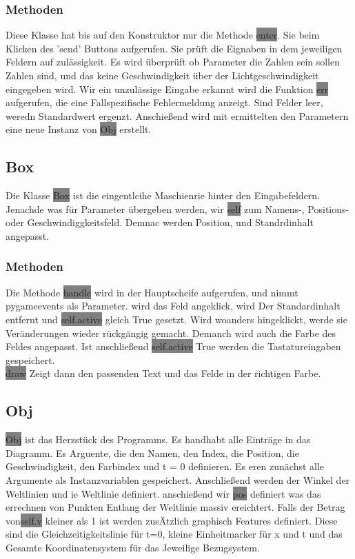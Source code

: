 \documentclass[12pt]{article}
\begin{document}
\subsubsection{Methoden}
Diese Klasse hat bis auf den Konstruktor nur die Methode \colorbox{gray}{enter}.
Sie beim Klicken des 'send' Buttons aufgerufen.
Sie prüft die Eignaben in dem jeweiligen Feldern auf zulässigkeit.
Es wird überprüft ob Parameter die Zahlen sein sollen Zahlen sind, und das keine Geschwindigkeit über der Lichtgeschwindigkeit eingegeben wird.
Wir ein unzulässige Eingabe erkannt wird die Funktion \colorbox{gray}{err} aufgerufen, die eine Fallspezifische Fehlermeldung anzeigt.
Sind Felder leer, weredn Standardwert ergenzt.
Anschießend wird mit ermittelten den Parametern eine neue Instanz von \colorbox{gray}{Obj} erstellt.
\label{inputm}
\subsection{Box}
Die Klasse \colorbox{gray}{Box} ist die eingentlcihe Maschienrie hinter den Eingabefeldern.
Jenachde was für Parameter übergeben werden, wir \colorbox{gray}{self} zum Namens-, Positions- oder Geschwindiggkeitsfeld.
Demnac werden Position, und Standrdinhalt angepasst.
\subsubsection{Methoden}
Die Methode \colorbox{gray}{handle} wird in der Hauptscheife aufgerufen, und nimmt pygameevents als Parameter.
wird das Feld angeklick, wird Der Standardinhalt entfernt und \colorbox{gray}{self.active} gleich True gesetzt.
Wird woanders hingeklickt, werde sie Veränderungen wieder rückgängig gemacht.
Demanch wird auch die Farbe des Feldes angepasst.
Ist anschließend \colorbox{gray}{self.active} True werden die Tastatureingaben gespeichert.
\\
\colorbox{gray}{draw} Zeigt dann den passenden Text und das Felde in der richtigen Farbe.
\subsection{Obj}
\colorbox{gray}{Obj} ist das Herzstück des Programms.
Es handhabt alle Einträge in das Diagramm.
Es Arguente, die den Namen, den Index, die Position, die Geschwindigkeit, den Farbindex und t = 0 definieren.
Es eren zunächst alle Argumente als Instanzvariablen gespeichert.
Anschließend werden der Winkel der Weltlinien und ie Weltlinie definiert.
anschießend wir \colorbox{gray}{pos} definiert was das errechnen von Punkten Entlang der Weltlinie massiv ereichtert.
Falls der Betrag von\colorbox{gray}{self.v} kleiner als 1 ist werden zusÄtzlich graphisch Features definiert.
Diese sind die Gleichzeitigkeitslinie für t=0, kleine Einheitmarker für x und t und das Gesamte Koordinatensystem für das Jeweilige Bezugsystem.
\end{document}
